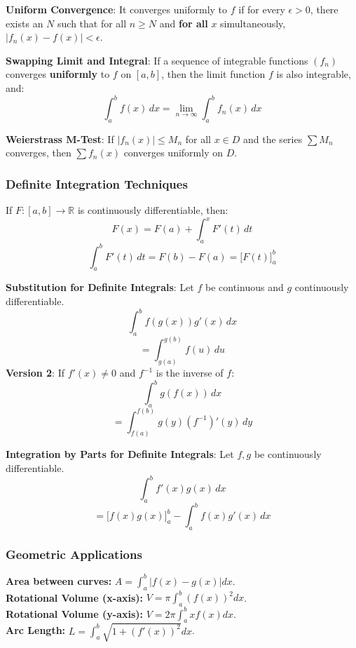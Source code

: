 \begin{definition}
    \textbf{Uniform Convergence}: It converges uniformly to $f$ if for every $\epsilon > 0$, there exists an $N$ such that for all $n \ge N$ and \textbf{for all} $x$ simultaneously, $|f_n(x) - f(x)| < \epsilon$.
\end{definition}

\begin{theorem}
    \textbf{Swapping Limit and Integral}: If a sequence of integrable functions $(f_n)$ converges \textbf{uniformly} to $f$ on $[a,b]$, then the limit function $f$ is also integrable, and:
    $$\int_a^b f(x) \, dx = \lim_{n \to \infty} \int_a^b f_n(x) \, dx$$
\end{theorem}

\begin{theorem}
    \textbf{Weierstrass M-Test}: If $|f_n(x)| \le M_n$ for all $x \in D$ and the series $\sum M_n$ converges, then $\sum f_n(x)$ converges uniformly on $D$.
\end{theorem}

\subsubsection{Definite Integration Techniques}

\begin{lemma}
    If $F: [a,b] \to \mathbb{R}$ is continuously differentiable, then:
    $$F(x) = F(a) + \int_{a}^{x} F'(t) \, dt$$
    $$\int_{a}^{b} F'(t) \, dt = F(b) - F(a) = \Big[ F(t) \Big]_a^b$$
\end{lemma}

\begin{lemma}
    \textbf{Substitution for Definite Integrals}: Let $f$ be continuous and $g$ continuously differentiable.
    $$\int_{a}^{b} f(g(x))g'(x) \, dx$$
    $$= \int_{g(a)}^{g(b)} f(u) \, du$$
    \textbf{Version 2}: If $f'(x) \neq 0$ and $f^{-1}$ is the inverse of $f$:
    $$\int_a^b g(f(x)) \, dx$$
    $$= \int_{f(a)}^{f(b)} g(y) (f^{-1})'(y) \, dy$$
\end{lemma}

\begin{lemma}
    \textbf{Integration by Parts for Definite Integrals}: Let $f, g$ be continuously differentiable.
    $$\int_{a}^{b} f'(x)g(x) \, dx$$
    $$= \Big[ f(x)g(x) \Big]_{a}^{b} - \int_{a}^{b} f(x)g'(x) \, dx$$
\end{lemma}

\subsubsection{Geometric Applications}
\textbf{Area between curves:} $A = \int_a^b |f(x) - g(x)| dx$. \\
\textbf{Rotational Volume (x-axis):} $V = \pi \int_a^b (f(x))^2 dx$. \\
\textbf{Rotational Volume (y-axis):} $V = 2\pi \int_a^b x f(x) dx$. \\
\textbf{Arc Length:} $L = \int_a^b \sqrt{1 + (f'(x))^2} dx$.

